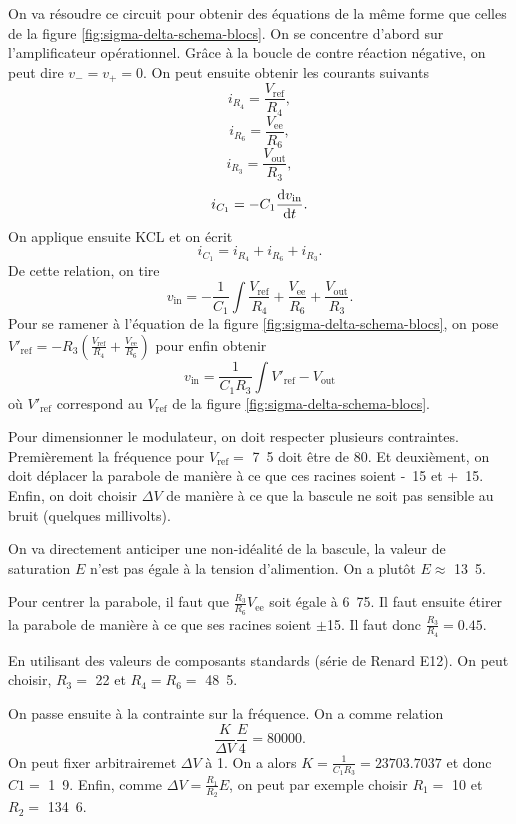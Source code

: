 On va résoudre ce circuit pour obtenir des équations
de la même forme que celles de la figure
\ref{fig:sigma-delta-schema-blocs}.
On se concentre d'abord sur l'amplificateur
opérationnel. Grâce à la boucle de contre
réaction négative, on peut dire $v_- = v_+ = 0$.
On peut ensuite obtenir les courants suivants
\[ i_{R_4} = \frac{V_{\text{ref}}}{R_4},\]
\[ i_{R_6} = \frac{V_{\text{ee}}}{R_6},\]
\[ i_{R_3} = \frac{V_{\text{out}}}{R_3},\]
\[ i_{C_1} = -C_1\frac{\operatorname{d}\! v_{\text{in}}}{\operatorname{d}\! t}.\]
On applique ensuite KCL et on écrit
\[ i_{C_1} = i_{R_4} + i_{R_6} + i_{R_3}.\]
De cette relation, on tire
\[ v_{\text{in}} = -\frac{1}{C_1}\int \frac{V_{\text{ref}}}{R_4}
+ \frac{V_{\text{ee}}}{R_6} + \frac{V_{\text{out}}}{R_3}.\]
Pour se ramener à l'équation de la figure
\ref{fig:sigma-delta-schema-blocs}, on pose
$V'_{\text{ref}} = -R_3(\frac{V_{\text{ref}}}{R_4}+\frac{V_{\text{ee}}}{R_6})$
pour enfin obtenir
\[ v_{\text{in}} = \frac{1}{C_1R_3} \int V'_{\text{ref}} - V_{\text{out}}\]
où $V'_{\text{ref}}$ correspond au $V_{\text{ref}}$
de la figure \ref{fig:sigma-delta-schema-blocs}.

Pour dimensionner le modulateur, on doit respecter plusieurs
contraintes. Premièrement la fréquence pour $V_{\text{ref}} =$
\unit{7.5}{\volt} doit être de \unit{80}{\kilo\hertz}. Et deuxièment,
on doit déplacer la parabole
de manière à ce que ces racines soient \unit{-15}{\volt} et
\unit{+15}{\volt}. Enfin, on doit choisir $\Delta V$ de manière
à ce que la bascule ne soit pas sensible au bruit (quelques millivolts).

On va directement anticiper une non-idéalité de la bascule,
la valeur de saturation $E$ n'est pas égale à la tension
d'alimention. On a plutôt $E \approx$ \unit{13.5}{\volt}.

Pour centrer la parabole, il faut que $\frac{R_3}{R_6}V_{\text{ee}}$
soit égale à \unit{6.75}{\volt}. Il faut ensuite étirer la
parabole de manière à ce que ses racines soient $\pm$\unit{15}{\volt}.
Il faut donc $\frac{R_3}{R_4} = 0.45$. 

En utilisant des valeurs de composants standards (série de Renard E12). 
On peut choisir, $R_3 =$ \unit{22}{\kilo\ohm} et $R_4 = R_6 =
$ \unit{48.5}{\kilo\ohm}.

On passe ensuite à la contrainte sur la fréquence. On a comme
relation 
\[ \frac{K}{\Delta V}\frac{E}{4} = 80000.\]
On peut fixer arbitrairemet $\Delta V$ à \unit{1}{\volt}. On a alors
$K = \frac{1}{C_1R_3} = 23703.7037$ et donc $C1 =$ \unit{1.9}{\nano\farad}.
Enfin, comme $\Delta V = \frac{R_1}{R_2}E$, on peut par exemple
choisir $R_1 =$ \unit{10}{\kilo\ohm} et $R_2 =$ \unit{134.6}{\kilo\ohm}.

